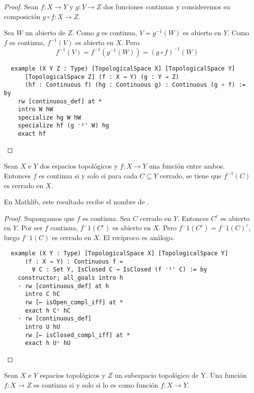\begin{proof}
  Sean $f : X \to Y$ y $g : Y \to Z$ dos funciones continuas y consideremos su composición $g \circ f : X \to Z$.

  Sea $W$ un abierto de $Z$. Como $g$ es continua, $V = g^{-1}(W)$ es abierto en $Y$. Como $f$ es continua, $f^{-1}(V)$ es abierto en $X$. Pero
  $$
  f^{-1}(V) = f^{-1}(g^{-1}(W)) = (g \circ f)^{-1}(W)
  $$

  \begin{lstlisting}
  example (X Y Z : Type) [TopologicalSpace X] [TopologicalSpace Y]
      [TopologicalSpace Z] (f : X → Y) (g : Y → Z)
      (hf : Continuous f) (hg : Continuous g) : Continuous (g ∘ f) := by
    rw [continuous_def] at *
    intro W hW
    specialize hg W hW
    specialize hf (g ⁻¹' W) hg
    exact hf \end{lstlisting}
\end{proof}

\begin{proposition}
  Sean $X$ e $Y$ dos espacios topológicos y $f : X \to Y$ una función entre ambos. Entonces $f$ es continua si y solo si para cada $C \subseteq Y$ cerrado, se tiene que $f^{-1}(C)$ es cerrado en $X$.
\end{proposition}

En Mathlib, este resultado recibe el nombre de .


\begin{proof}
  Supongamos que $f$ es continua. Sea $C$ cerrado en $Y$. Entonces $C^c$ es abierto en $Y$. Por ser $f$ continua, $f^-1(C^c)$ es abierto en $X$. Pero $f^-1(C^c) = f^-1(C)^c$, luego $f^-1(C)$ es cerrado en $X$. El recíproco es análogo.
  
  \begin{lstlisting}
  example (X Y : Type) [TopologicalSpace X] [TopologicalSpace Y]
      (f : X → Y) : Continuous f ↔
        ∀ C : Set Y, IsClosed C → IsClosed (f ⁻¹' C) := by
    constructor; all_goals intro h
    · rw [continuous_def] at h
      intro C hC
      rw [← isOpen_compl_iff] at *
      exact h Cᶜ hC
    · rw [continuous_def]
      intro U hU
      rw [← isClosed_compl_iff] at *
      exact h Uᶜ hU  \end{lstlisting}

\end{proof}

\begin{proposition}\label{prop:continuidad-subespacio}
  Sean $X$ e $Y$ espacios topológicos y $Z$ un subespacio topológico de Y. Una función $f : X \to Z$ es continua si y solo si lo es como función $f : X \to Y$.
\end{proposition}

